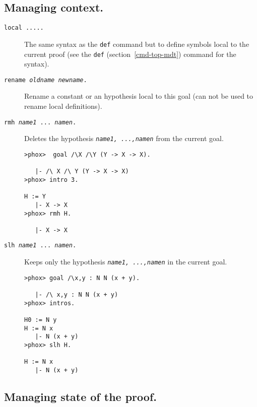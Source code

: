 \subsection{Managing context.}
\begin{description}

\item[{\tt local .....}]
  
  The same syntax as the {\tt def} command but to define symbols local
  to the current proof (see the {\tt def} (section~\ref{cmd-top-mdt})
  command for the syntax).

\item[{\tt rename {\em oldname} {\em newname}.}]

  Rename a constant or an hypothesis local to this goal (can not be used to rename local definitions).

\item[{\tt rmh {\em name1} ... {\em namen}.}]

  Deletes the hypothesis {\tt\em name1, ...,namen} from the current goal.

\begin{verbatim}
>phox>  goal /\X /\Y (Y -> X -> X). 

   |- /\ X /\ Y (Y -> X -> X)
>phox> intro 3.

H := Y
   |- X -> X
>phox> rmh H.

   |- X -> X
\end{verbatim}

\item[{\tt slh {\em name1} ... {\em namen}.}]

  Keeps only the hypothesis {\tt\em name1, ...,namen} in the current goal.

\begin{verbatim}
>phox> goal /\x,y : N N (x + y).

   |- /\ x,y : N N (x + y)
>phox> intros.

H0 := N y
H := N x
   |- N (x + y)
>phox> slh H.

H := N x
   |- N (x + y)
\end{verbatim}
\end{description}

\subsection{Managing state of the proof.}

